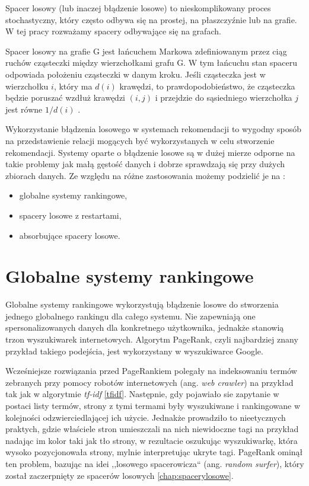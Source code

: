 Spacer losowy (lub inaczej błądzenie losowe) to nieskomplikowany proces stochastyczny, który często odbywa się na prostej, na płaszczyźnie lub na grafie. W tej pracy rozważamy spacery odbywające się na grafach.
\begin{definition}\label{def:spacer}
Spacer losowy na grafie G jest łańcuchem Markowa zdefiniowanym przez ciąg ruchów cząsteczki między wierzchołkami grafu G. W tym łańcuchu stan spaceru odpowiada położeniu cząsteczki w danym kroku. Jeśli cząsteczka jest w wierzchołku $i$, który ma $d(i)$ krawędzi, to prawdopodobieństwo, że cząsteczka będzie poruszać wzdłuż krawędzi $(i, j)$ i przejdzie do sąsiedniego wierzchołka $j$ jest równe $1/d(i)$ .
\end{definition}

Wykorzystanie błądzenia losowego w systemach rekomendacji to wygodny sposób na przedstawienie relacji mogących być wykorzystanych w celu stworzenie rekomendacji. Systemy oparte o błądzenie losowe są w dużej mierze odporne na takie problemy jak małą gęstość danych i dobrze sprawdzają się przy dużych zbiorach danych. Ze względu na różne zastosowania możemy podzielić je na \cite{RecommenderASurvey} :
\begin{itemize}
    \item globalne systemy rankingowe,
    \item spacery losowe z restartami,
    \item absorbujące spacery losowe.
\end{itemize}


\section{Globalne systemy rankingowe}


Globalne systemy rankingowe wykorzystują błądzenie losowe do stworzenia jednego globalnego rankingu dla całego systemu. Nie zapewniają one spersonalizowanych danych dla konkretnego użytkownika, jednakże stanowią trzon wyszukiwarek internetowych. Algorytm PageRank, czyli najbardziej znany przykład takiego podejścia, jest wykorzystany w wyszukiwarce Google. 


Wcześniejsze rozwiązania przed PageRankiem polegały na indeksowaniu termów zebranych przy pomocy robotów internetowych (ang. \textit{web crawler}) na przykład tak jak w algorytmie \textit{tf-idf} \ref{tfidf}. Następnie, gdy pojawiało sie zapytanie w postaci listy termów, strony z tymi termami były wyszukiwane i rankingowane w kolejności odzwierciedlającej ich użycie. Jednakże prowadziło to nieetycznych praktych, gdzie właściele stron umieszczali na nich niewidoczne tagi na przykład nadając im kolor taki jak tło strony, w rezultacie oszukując wyszukiwarkę, która wysoko pozycjonowała strony, mylnie interpretując ukryte tagi. PageRank ominął ten problem, bazując na idei ,,losowego spacerowicza`` (ang. \textit{random surfer}), który został zaczerpnięty ze spacerów losowych \ref{chap:spacerylosowe}.

